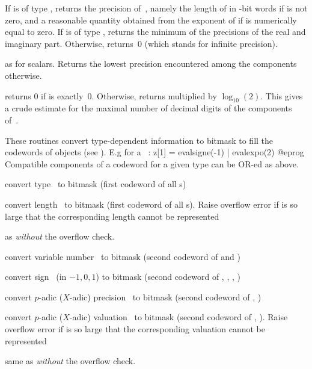 If  is of type , returns the
precision of~, namely the length of  in \B-bit words if 
is not zero, and a reasonable quantity obtained from the exponent of 
if  is numerically equal to zero. If  is of type
, returns the minimum of the precisions of the real and
imaginary part. Otherwise, returns~0 (which stands for infinite precision).

 as  for scalars. Returns the
lowest precision encountered among the components otherwise.

 returns 0 if  is exactly~0. Otherwise,
returns  multiplied by $\log_{10}(2)$. This gives a crude
estimate for the maximal number of decimal digits of the components
of~.

These routines convert type-dependent information to bitmask to fill the
codewords of  objects (see ). E.g for a
~:
\bprog
  z[1] = evalsigne(-1) | evalexpo(2)
@eprog
Compatible components of a codeword for a given type can be OR-ed as above.

 convert type~ to bitmask (first
codeword of all s)

 convert length~ to bitmask (first
codeword of all s). Raise overflow error if  is so large that
the corresponding length cannot be represented

 as  \emph{without} the overflow
check.

 convert variable number~ to bitmask
(second codeword of  and )

 convert sign~ (in $-1,0,1$) to bitmask
(second codeword of , , , )

 convert $p$-adic ($X$-adic) precision~
to bitmask (second codeword of , )

 convert $p$-adic ($X$-adic) valuation~ to
bitmask (second codeword of , ). Raise overflow error if
 is so large that the corresponding valuation cannot be represented

 same as  \emph{without} the
overflow check.

